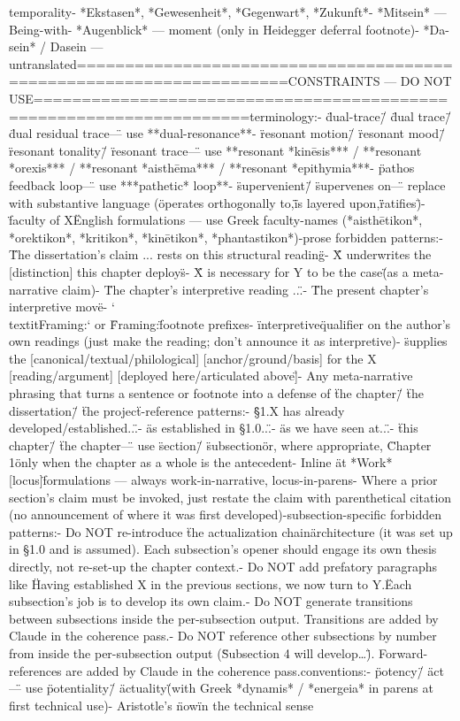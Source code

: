 {temporality\n- *Ekstasen*, *Gewesenheit*, *Gegenwart*, *Zukunft*\n- *Mitsein* — Being-with\n- *Augenblick* — moment (only in Heidegger deferral footnote)\n- *Da-sein* / Dasein — untranslated\n\n====================================================================\nVOCABULARY CONSTRAINTS — DO NOT USE\n====================================================================\n\nRetired terminology:\n- \"dual-trace\" / \"dual trace\" / \"dual residual trace\" — use **dual-resonance**\n- \"resonant motion\" / \"resonant mood\" / \"resonant tonality\" / \"resonant trace\" — use **resonant *kinēsis*** / **resonant *orexis*** / **resonant *aisthēma*** / **resonant *epithymia***\n- \"pathos feedback loop\" — use ***pathetic* loop**\n- \"supervenient\" / \"supervenes on\" — replace with substantive language (\"operates orthogonally to,\" \"is layered upon,\" \"ratifies\")\n- \"faculty of X\" English formulations — use Greek faculty-names (*aisthētikon*, *orektikon*, *kritikon*, *kinētikon*, *phantastikon*)\n\nAdvisor-prose forbidden patterns:\n- \"The dissertation's claim ... rests on this structural reading\"\n- \"X underwrites the [distinction] this chapter deploys\"\n- \"X is necessary for Y to be the case\" (as a meta-narrative claim)\n- \"The chapter's interpretive reading ...\"\n- \"The present chapter's interpretive move\"\n- `\\textit{Framing}:` or \"Framing:\" footnote prefixes\n- \"interpretive\" qualifier on the author's own readings (just make the reading; don't announce it as interpretive)\n- \"supplies the [canonical/textual/philological] [anchor/ground/basis] for the X [reading/argument] [deployed here/articulated above]\"\n- Any meta-narrative phrasing that turns a sentence or footnote into a defense of \"the chapter\" / \"the dissertation\" / \"the project\"\n\nBack-reference patterns:\n- \"§1.X has already developed/established...\"\n- \"as established in §1.0...\"\n- \"as we have seen at...\"\n- \"this chapter\" / \"the chapter\" — use \"section\" / \"subsection\" or, where appropriate, \"Chapter 1\" only when the chapter as a whole is the antecedent\n- Inline \"at *Work* [locus]\" formulations — always work-in-narrative, locus-in-parens\n- Where a prior section's claim must be invoked, just restate the claim with parenthetical citation (no announcement of where it was first developed)\n\nPer-subsection-specific forbidden patterns:\n- Do NOT re-introduce \"the actualization chain\" architecture (it was set up in §1.0 and is assumed). Each subsection's opener should engage its own thesis directly, not re-set-up the chapter context.\n- Do NOT add prefatory paragraphs like \"Having established X in the previous sections, we now turn to Y.\" Each subsection's job is to develop its own claim.\n- Do NOT generate transitions between subsections inside the per-subsection output. Transitions are added by Claude in the coherence pass.\n- Do NOT reference other subsections by number from inside the per-subsection output (\"Subsection 4 will develop…\"). Forward-references are added by Claude in the coherence pass.\n\nTranslation conventions:\n- \"potency\" / \"act\" — use \"potentiality\" / \"actuality\" (with Greek *dynamis* / *energeia* in parens at first technical use)\n- Aristotle's \"now\" in the technical sense }
